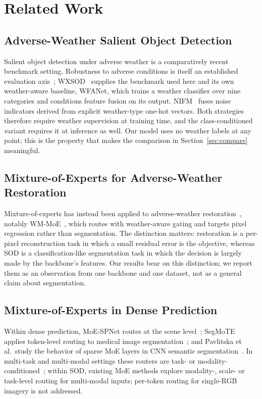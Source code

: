 \documentclass[10pt,a4paper,twocolumn,twoside]{article}
\begin{document}
\section{Related Work}
\label{sec:related}

\subsection{Adverse-Weather Salient Object Detection}
Salient object detection under adverse weather is a comparatively recent benchmark setting. Robustness to adverse conditions is itself an established evaluation axis~\cite{hendrycks2019corruptions,sakaridis2021acdc};
WXSOD~\cite{wxsod2025} supplies the benchmark used here and its own weather-aware baseline,
WFANet, which trains a weather classifier over nine categories and conditions feature fusion
on its output. NIFM~\cite{nifm2025} fuses noise indicators derived from explicit weather-type
one-hot vectors. Both strategies therefore require weather supervision at training time, and
the class-conditioned variant requires it at inference as well. Our model uses no weather
labels at any point; this is the property that makes the comparison in
Section~\ref{sec:compare} meaningful.

\subsection{Mixture-of-Experts for Adverse-Weather Restoration}
Mixture-of-experts has instead been applied to adverse-weather restoration~\cite{valanarasu2022transweather,li2020allinone}, notably
WM-MoE~\cite{wmmoe2023}, which routes with weather-aware gating and targets pixel regression
rather than segmentation. The distinction matters: restoration is a per-pixel reconstruction
task in which a small residual error is the objective, whereas SOD is a classification-like
segmentation task in which the decision is largely made by the backbone's features. Our
results bear on this distinction; we report them as an observation from one backbone and one
dataset, not as a general claim about segmentation.

\subsection{Mixture-of-Experts in Dense Prediction}
Within dense prediction, MoE-SPNet routes at the scene level~\cite{moespnet};
SegMoTE applies token-level routing to medical image segmentation~\cite{segmote}; and
Pavlitska et al.\ study the behavior of sparse MoE layers in CNN semantic
segmentation~\cite{sparsemoecnn,pavlitskaya2020moeseg}. In multi-task and multi-modal settings these routers are
task- or modality-conditioned~\cite{liang2022m3vit,chen2023modsquad,m4sam2026}; within SOD,
existing MoE methods explore modality-, scale- or task-level routing for multi-modal inputs;
per-token routing for single-RGB imagery is not addressed.
\end{document}

